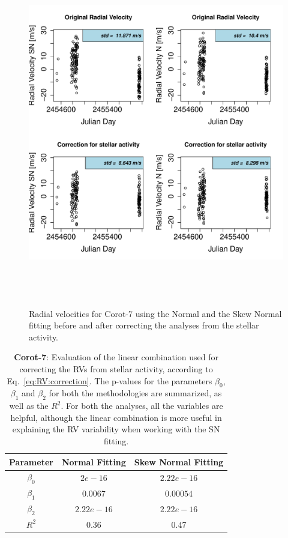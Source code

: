 \documentclass[11pt, oneside]{article}
\begin{document}
\begin{figure}[htbp]
   \centering
\includegraphics[height = 6in]{LRa01_E_[3]CorrectionActivity_RadialVelocity_vs_time.pdf} 
   \caption{Radial velocities for Corot-7 using the Normal and the Skew Normal fitting before and after correcting the analyses from the stellar activity.}
   \label{fig:Corot7:correctionRV}
\end{figure}

\begin{table}[!t]
\begin{tabular}{|c|c|c|}
\hline
Parameter          & Normal Fitting         &   Skew Normal Fitting \\
\hline
$\beta_{0}$            &    $2e-16$    & $2.22e-16$ \\
\hline
$\beta_{1}$            &    $0.0067$    & $0.00054$ \\
\hline
$\beta_{2}$            &     $2.22e-16$   &  $2.22e-16$ \\
\hline
$R^{2}$      &     $0.36$    &  $0.47$   \\
\hline
\end{tabular}
\caption{\textbf{Corot-7}: Evaluation of the linear combination used for correcting the RVs from stellar activity, according to Eq.~\ref{eq:RV:correction}. The p-values for the parameters $\beta_{0}$, $\beta_{1}$ and $\beta_{2}$ for both the methodologies are summarized, as well as the $R^2$. For both the analyses, all the variables are helpful, although the linear combination is more useful in explaining the RV variability when working with the SN fitting.}
\label{table:Corot7:test}
\end{table}
\end{document}
